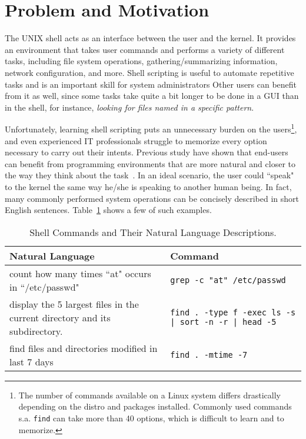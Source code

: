 \section{Problem and Motivation}

The UNIX shell acts as an interface between the user and the kernel. It provides an environment that takes user commands and performs a variety of different tasks, including file system operations, gathering/summarizing information, network configuration, and more. Shell scripting is useful to automate repetitive tasks and is an important skill for system administrators
Other users can benefit from it as well, since some tasks take quite a bit longer to be done in a GUI than in the shell, for instance, {\it looking for files named in a specific pattern}.

Unfortunately, learning shell scripting puts an unnecessary burden on the users\footnote{The number of commands available on a Linux system differs drastically depending on the distro and packages installed. Commonly used commands s.a. {\tt find} can take more than 40 options, which is difficult to learn and to memorize.}, and even experienced IT professionals struggle to memorize every option necessary to carry out their intents. Previous study have shown that end-users can benefit from programming environments that are more natural and closer to the way they think about the task~\cite{Myers:2004:NPL:1015864.1015888}. In an ideal scenario, the user could ``speak" to the kernel the same way he/she is speaking to another human being. In fact, many commonly performed system operations can be concisely described in short English sentences. Table~\ref{table:examples} shows a few of such examples.

\begin{center}
\begin{table}[ht]
\begin{tabular}{p{1.5in}p{1.5in}}
    \textbf{Natural Language} & \textbf{Command} \\
    \hline \hline
    count how many times ``at" occurs in ``/etc/passwd" %
        &
        \texttt{grep -c "at" /etc/passwd} \\
    \hline
     display the 5 largest files in the current directory and its subdirectory. %
         &
         \texttt{find . -type f -exec ls -s {} \; | sort -n -r | head -5} \\
     \hline
     find files and directories modified in last 7 days%
         &
         \texttt{find . -mtime -7} \\
\end{tabular}
\caption{Shell Commands and Their Natural Language Descriptions.}
\label{table:examples}
\end{table}
\end{center}

